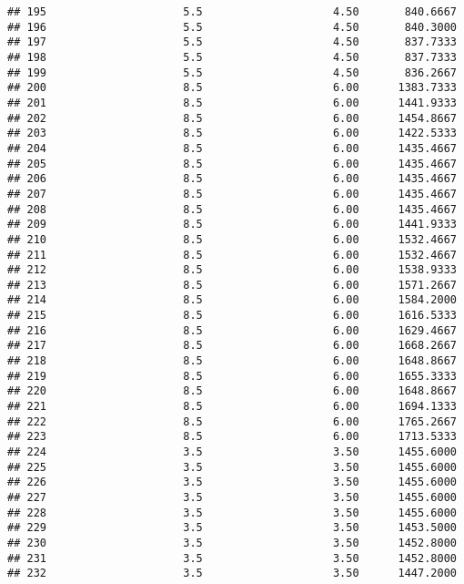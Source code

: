 \documentclass[]{article}
\begin{document}
\begin{verbatim}
## 195                     5.5                    4.50       840.6667
## 196                     5.5                    4.50       840.3000
## 197                     5.5                    4.50       837.7333
## 198                     5.5                    4.50       837.7333
## 199                     5.5                    4.50       836.2667
## 200                     8.5                    6.00      1383.7333
## 201                     8.5                    6.00      1441.9333
## 202                     8.5                    6.00      1454.8667
## 203                     8.5                    6.00      1422.5333
## 204                     8.5                    6.00      1435.4667
## 205                     8.5                    6.00      1435.4667
## 206                     8.5                    6.00      1435.4667
## 207                     8.5                    6.00      1435.4667
## 208                     8.5                    6.00      1435.4667
## 209                     8.5                    6.00      1441.9333
## 210                     8.5                    6.00      1532.4667
## 211                     8.5                    6.00      1532.4667
## 212                     8.5                    6.00      1538.9333
## 213                     8.5                    6.00      1571.2667
## 214                     8.5                    6.00      1584.2000
## 215                     8.5                    6.00      1616.5333
## 216                     8.5                    6.00      1629.4667
## 217                     8.5                    6.00      1668.2667
## 218                     8.5                    6.00      1648.8667
## 219                     8.5                    6.00      1655.3333
## 220                     8.5                    6.00      1648.8667
## 221                     8.5                    6.00      1694.1333
## 222                     8.5                    6.00      1765.2667
## 223                     8.5                    6.00      1713.5333
## 224                     3.5                    3.50      1455.6000
## 225                     3.5                    3.50      1455.6000
## 226                     3.5                    3.50      1455.6000
## 227                     3.5                    3.50      1455.6000
## 228                     3.5                    3.50      1455.6000
## 229                     3.5                    3.50      1453.5000
## 230                     3.5                    3.50      1452.8000
## 231                     3.5                    3.50      1452.8000
## 232                     3.5                    3.50      1447.2000

\end{verbatim}
\end{document}
